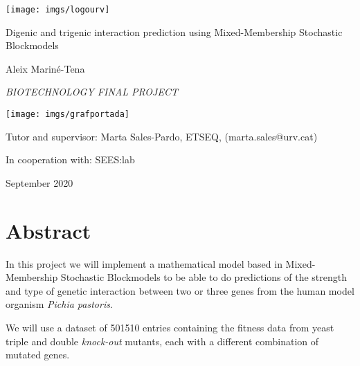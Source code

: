 \documentclass[11pt]{article}
\title{}
\date{}
\author{}
\begin{document}
  \begin{titlepage}
    \centering
    \texttt{[image: imgs/logourv]}  %
    \par        
    \vspace{1cm}
    \Large
    {Digenic and trigenic interaction prediction using Mixed-Membership Stochastic Blockmodels \par}
    \vspace{1cm}
    {Aleix Mariné-Tena \par}
    \vspace{1cm}
    {\itshape\Large BIOTECHNOLOGY FINAL PROJECT \par}
    \vfill

    \vspace{1cm} 
    \texttt{[image: imgs/grafportada]}  %
    \par    
    \vspace{1cm}  
    \vfill
    
    \large
    \raggedright
    {Tutor and supervisor: Marta Sales-Pardo, ETSEQ, (marta.sales@urv.cat) \par}
    {In cooperation with: SEES:lab \par}
 	\vspace{2cm}
    
    \raggedleft
    {\large September 2020 \par}
  \end{titlepage}
  
  \newpage

  \tableofcontents
  \newpage

\setlength{\parskip}{1em}  %
\onehalfspacing  %
\normalsize  %

\section{Abstract}
\par
In this project we will implement a mathematical model based in Mixed-Membership Stochastic Blockmodels to be able to do predictions of the strength and type of genetic interaction between two or three genes from the human model organism \textit{Pichia pastoris}. 

\par
We will use a dataset of 501510 entries containing the fitness data from yeast triple and double \textit{knock-out}  mutants, each with a different combination of mutated genes.
\end{document}
